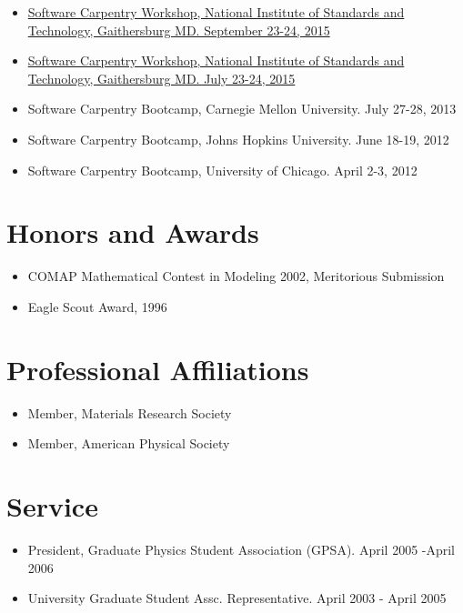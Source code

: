\begin{itemize}
\tightlist
\item
  \href{https://pages.nist.gov/2015-09-23-nist/}{Software Carpentry
  Workshop, National Institute of Standards and Technology, Gaithersburg
  MD. September 23-24, 2015}
\item
  \href{https://pages.nist.gov/2015-07-23-nist/}{Software Carpentry
  Workshop, National Institute of Standards and Technology, Gaithersburg
  MD. July 23-24, 2015}
\item
  Software Carpentry Bootcamp, Carnegie Mellon University. July 27-28,
  2013
\item
  Software Carpentry Bootcamp, Johns Hopkins University. June 18-19,
  2012
\item
  Software Carpentry Bootcamp, University of Chicago. April 2-3, 2012
\end{itemize}

\section{Honors and Awards}\label{honors-and-awards}

\begin{itemize}
\tightlist
\item
  COMAP Mathematical Contest in Modeling 2002, Meritorious Submission
\item
  Eagle Scout Award, 1996
\end{itemize}

\section{Professional Affiliations}\label{professional-affiliations}

\begin{itemize}
\tightlist
\item
  Member, Materials Research Society
\item
  Member, American Physical Society
\end{itemize}

\section{Service}\label{service}

\begin{itemize}
\tightlist
\item
  President, Graduate Physics Student Association (GPSA). April 2005
  -April 2006
\item
  University Graduate Student Assc. Representative. April 2003 - April
  2005
\end{itemize}

